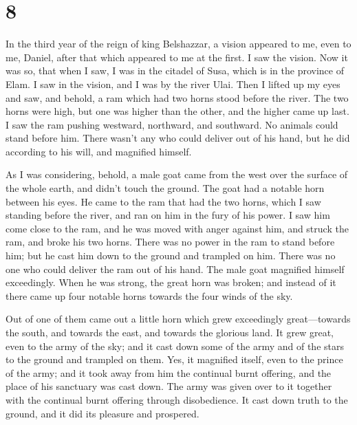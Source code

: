 \hypertarget{section-7}{%
\section{8}\label{section-7}}

 In the third year of the reign of king Belshazzar, a
vision appeared to me, even to me, Daniel, after that which appeared to
me at the first.  I saw the vision. Now it was so, that
when I saw, I was in the citadel of Susa, which is in the province of
Elam. I saw in the vision, and I was by the river Ulai. 
Then I lifted up my eyes and saw, and behold, a ram which had two horns
stood before the river. The two horns were high, but one was higher than
the other, and the higher came up last.  I saw the ram
pushing westward, northward, and southward. No animals could stand
before him. There wasn't any who could deliver out of his hand, but he
did according to his will, and magnified himself.

 As I was considering, behold, a male goat came from the
west over the surface of the whole earth, and didn't touch the ground.
The goat had a notable horn between his eyes.  He came to
the ram that had the two horns, which I saw standing before the river,
and ran on him in the fury of his power.  I saw him come
close to the ram, and he was moved with anger against him, and struck
the ram, and broke his two horns. There was no power in the ram to stand
before him; but he cast him down to the ground and trampled on him.
There was no one who could deliver the ram out of his hand.
 The male goat magnified himself exceedingly. When he was
strong, the great horn was broken; and instead of it there came up four
notable horns towards the four winds of the sky.

 Out of one of them came out a little horn which grew
exceedingly great---towards the south, and towards the east, and towards
the glorious land.  It grew great, even to the army of
the sky; and it cast down some of the army and of the stars to the
ground and trampled on them.  Yes, it magnified itself,
even to the prince of the army; and it took away from him the continual
burnt offering, and the place of his sanctuary was cast down.
 The army was given over to it together with the
continual burnt offering through disobedience. It cast down truth to the
ground, and it did its pleasure and prospered.

